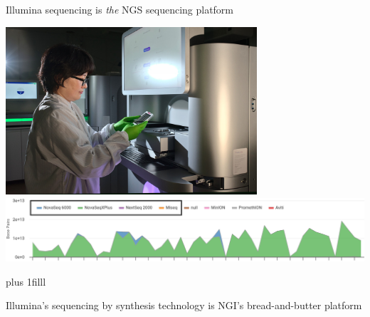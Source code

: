 \documentclass[10pt]{beamer}
\newcommand{\creditleft}[1]{{\vskip0pt plus 1filll \par \raggedright \scriptsize \mdseries \color{mDarkBrown} #1 \par}}
\begin{document}
\begin{frame}{Illumina sequencing is \emph{the} NGS sequencing platform}
	\begin{center}
		\includegraphics[width=0.7\textwidth]{./figures/ngi-choi-novaseqxplus.jpg} \\
		\hspace*{-1cm}
		\includegraphics[width=1.2\textwidth]{./figures/ngis-throughput-2024-illumina.png}
	\end{center}
\creditleft{Illumina's sequencing by synthesis technology is NGI's bread-and-butter platform}
\end{frame}
\end{document}
